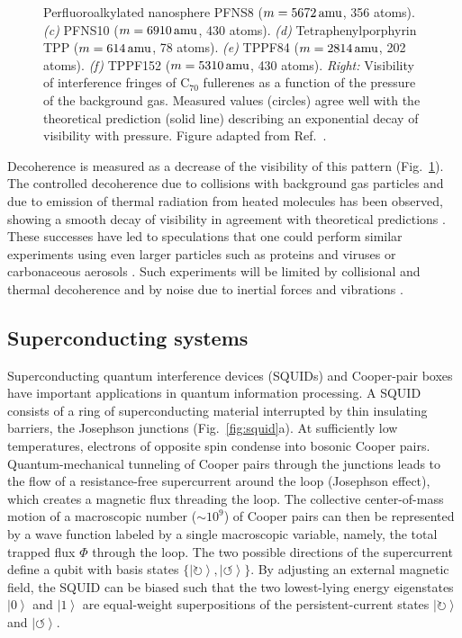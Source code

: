 \documentclass[aps,pra,reprint,amsmath,amssymb,showpacs,nofootinbib,floatfix,onecolumn,12pt]{revtex4-1}
\newcommand{\ket}[1]{\left\vert{#1}\right\rangle}
\begin{document}
\begin{figure}[t]
{Perfluoroalkylated nanosphere PFNS8 ($m = \unit[5672]{amu}$, 356 atoms). \emph{(c)} PFNS10 ($m = \unit[6910]{amu}$, 430 atoms). \emph{(d)} Tetraphenylporphyrin TPP ($m = \unit[614]{amu}$, 78 atoms). \emph{(e)} TPPF84 ($m = \unit[2814]{amu}$, 202 atoms). \emph{(f)} TPPF152 ($m = \unit[5310]{amu}$, 430 atoms). \emph{Right:} Visibility of interference fringes of C$_{70}$ fullerenes as a function of the pressure of the background gas. Measured values (circles) agree well with the theoretical prediction (solid line) \cite{Hornberger:2003:un,Hornberger:2004:bb,Hornberger:2005:mo} describing an exponential decay of visibility with pressure. Figure adapted from
  Ref.~\cite{Hackermuller:2003:uu}.}
\label{fig:c70-vis}
\end{figure}

Decoherence is measured as a decrease of the visibility of this pattern (Fig.~\ref{fig:c70-vis}). The controlled decoherence due to collisions with background gas particles \cite{Hackermuller:2003:uu,Hornberger:2003:tv} and due to emission of thermal radiation from heated molecules \cite{Hackermuller:2004:rd} has been observed, showing a smooth decay of visibility in agreement with theoretical predictions \cite{Hornberger:2003:un,Hornberger:2004:bb,Hornberger:2005:mo}. These successes have led to speculations that one could perform similar experiments using even larger particles such as proteins and viruses \cite{Hackermuller:2003:uu,Arndt:2002:bo} or carbonaceous aerosols \cite{Hornberger:2006:tx}. Such experiments will be limited by collisional and thermal decoherence and by noise due to inertial forces and vibrations \cite{Hackermuller:2003:uu,Arndt:2002:bo,Hornberger:2006:tx}.

\subsection{\label{sec:superc-syst}Superconducting systems}


Superconducting quantum interference devices (SQUIDs) and Cooper-pair boxes have important applications in quantum information processing. A SQUID consists of a ring of superconducting material interrupted by thin insulating barriers, the Josephson junctions (Fig.~\ref{fig:squid}a). At sufficiently low temperatures, electrons of opposite spin condense into bosonic Cooper pairs.  Quantum-mechanical tunneling of Cooper pairs through the junctions leads to the flow of a resistance-free supercurrent around the loop (Josephson effect), which creates a magnetic flux threading the loop. The collective center-of-mass motion of a macroscopic number ($\sim 10^9$) of Cooper pairs can then be represented by a wave function labeled by a single macroscopic variable, namely, the total trapped flux $\Phi$ through the loop.  The two possible directions of the supercurrent define a qubit with basis states $\{\ket{\circlearrowright}, \ket{\circlearrowleft} \}$. By adjusting an external magnetic field, the SQUID can be biased such that the two lowest-lying energy eigenstates $\ket{0}$ and $\ket{1}$ are equal-weight superpositions of the persistent-current states $\ket{\circlearrowright}$ and $\ket{\circlearrowleft}$. 
\end{document}
